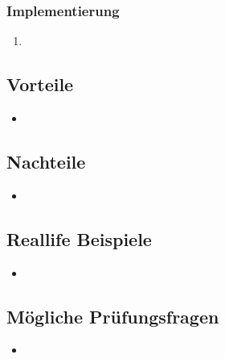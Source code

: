 \subsubsection*{Implementierung}
\begin{enumerate}
	\item 
\end{enumerate}


\subsection*{Vorteile}
\begin{itemize}
	\item 
\end{itemize}


\subsection*{Nachteile}
\begin{itemize}
	\item 
\end{itemize}


\subsection*{Reallife Beispiele}
\begin{itemize}
	\item 
\end{itemize}


\subsection*{Mögliche Prüfungsfragen}
\begin{itemize}
	\item 
\end{itemize}